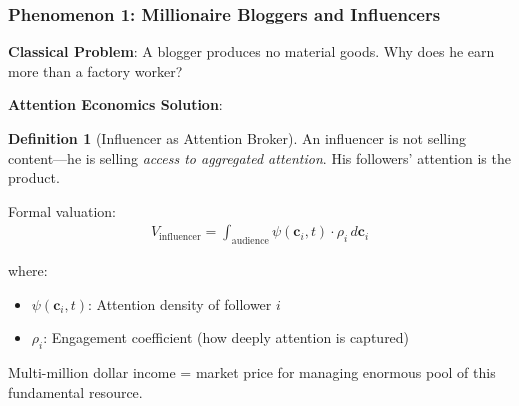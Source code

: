 \documentclass[11pt,a4paper]{article}
\theoremstyle{definition}
\newtheorem{definition}{Definition}[section]
\theoremstyle{remark}
\newcommand{\cc}{\mathbf{c}}
\begin{document}
\subsubsection{Phenomenon 1: Millionaire Bloggers and Influencers}

\textbf{Classical Problem}: A blogger produces no material goods. Why does he earn more than a factory worker?

\textbf{Attention Economics Solution}:

\begin{definition}[Influencer as Attention Broker]
An influencer is not selling content—he is selling \textit{access to aggregated attention}. His followers' attention is the product.

Formal valuation:
\begin{align}
V_{\text{influencer}} = \int_{\text{audience}} \psi(\cc_i, t) \cdot \rho_i \, d\cc_i
\end{align}

where:
\begin{itemize}
\item \(\psi(\cc_i, t)\): Attention density of follower \(i\)
\item \(\rho_i\): Engagement coefficient (how deeply attention is captured)
\end{itemize}

Multi-million dollar income = market price for managing enormous pool of this fundamental resource.
\end{definition}
\end{document}
